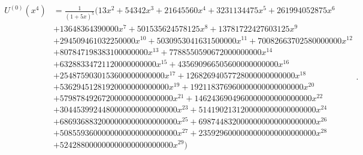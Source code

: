 \documentclass[12pt, reqno]{amsart}
\theoremstyle{definition}
\theoremstyle{remark}
\begin{document}
\begin{align*}
\begin{split}
U^{(0)}(x^4) &= \frac{1}{(1+5x)^5}(13 x^{2}+54342 x^{3}+21645560 x^{4}+3231134475 x^{5}+261994052875 x^{6}\\
&+13648364390000 x^{7}+501535624578125 x^{8}+13781722427603125 x^{9}\\
&+294509461032250000 x^{10} +5030953041631500000 x^{11}+70082663702580000000 x^{12}\\
&+807847198383100000000 x^{13} +7788550590672000000000 x^{14}\\
&+63288334721120000000000 x^{15}+435690966505600000000000 x^{16}\\
&+2548759030153600000000000 x^{17}+12682694057728000000000000 x^{18} \\
&+53629451281920000000000000 x^{19} +192118376960000000000000000 x^{20}\\
&+579878492672000000000000000 x^{21}+1462436904960000000000000000 x^{22}\\
&+3044539924480000000000000000 x^{23}+5141902131200000000000000000 x^{24}\\
&+6869368832000000000000000000 x^{25}+6987448320000000000000000000 x^{26}\\
&+5085593600000000000000000000 x^{27}+2359296000000000000000000000 x^{28}\\
&+524288000000000000000000000 x^{29})    
\end{split}.
\end{align*}




\end{document}
